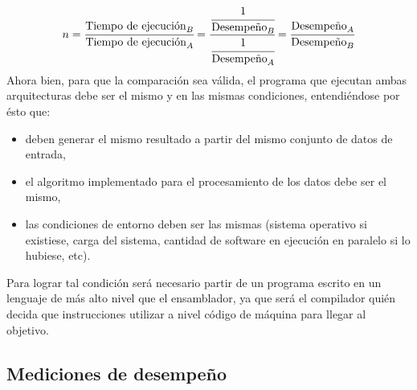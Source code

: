 \begin{equation}
  \label{eq:performance-performance_ratio}
  n = \cfrac{\text{Tiempo de ejecución}_{B}}{\text{Tiempo de ejecución}_{A}} = 
\cfrac{\cfrac{1}{\text{Desempeño}_{B}}}{\cfrac{1}{\text{Desempeño}_{A}}} = 
\cfrac{\text{Desempeño}_{A}}{\text{Desempeño}_{B}}
\end{equation}
Ahora bien, para que la comparación sea válida, el programa que ejecutan ambas 
arquitecturas debe ser el mismo y en las mismas condiciones, entendiéndose por 
ésto que:
\begin{itemize}
  \item deben generar el mismo resultado a partir del mismo conjunto de 
datos de entrada,
  \item el algoritmo implementado para el procesamiento de los datos debe ser 
el mismo,
  \item las condiciones de entorno deben ser las mismas (sistema operativo si 
existiese, carga del sistema, cantidad de software en ejecución en paralelo si 
lo hubiese, etc).
\end{itemize}
Para lograr tal condición será necesario partir de un programa escrito en un 
lenguaje de más alto nivel que el ensamblador, ya que será el compilador quién 
decida que instrucciones utilizar a nivel código de máquina para llegar al 
objetivo.

\subsection{Mediciones de desempeño}
\label{subsec:perfomance-measuring}

